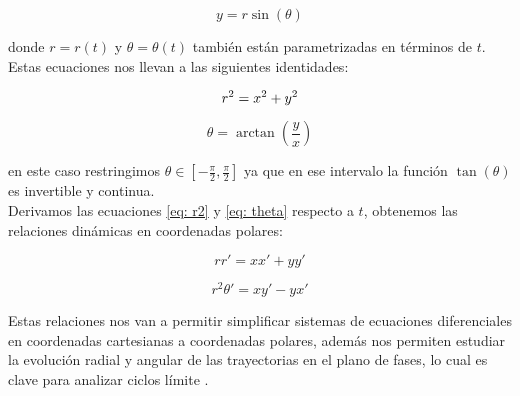 \begin{equation}\label{eq: ypolar}
	y=r\sin(\theta)
\end{equation}

donde $r=r(t)$ y $\theta=\theta(t)$ también están parametrizadas en términos de $t$.\\

Estas ecuaciones nos llevan a las siguientes identidades:

\begin{equation}\label{eq: r2}
	r^2=x^2+y^2\\
\end{equation}

\begin{equation}\label{eq: theta}
	\theta=\arctan{\left(\frac{y}{x}\right)}
\end{equation}

en este caso restringimos $\theta\in\left[-\frac{\pi}{2},\frac{\pi}{2}\right]$ ya que en ese intervalo la función $\tan\left(\theta\right)$ es invertible y continua.\\

Derivamos las ecuaciones \eqref{eq: r2} y \eqref{eq: theta} respecto a $t$, obtenemos las relaciones dinámicas en coordenadas polares:

\begin{equation}\label{eq: drcart}
	rr'=xx'+yy'
\end{equation}

\begin{equation}\label{eq: dthetacart}
	r^2\theta'=xy'-yx'
\end{equation}

Estas relaciones nos van a permitir simplificar sistemas de ecuaciones diferenciales en coordenadas cartesianas a coordenadas polares, además nos permiten estudiar la evolución radial y angular de las trayectorias en el plano de fases, lo cual es clave para analizar ciclos límite \cite{perko2001differential}.\\

